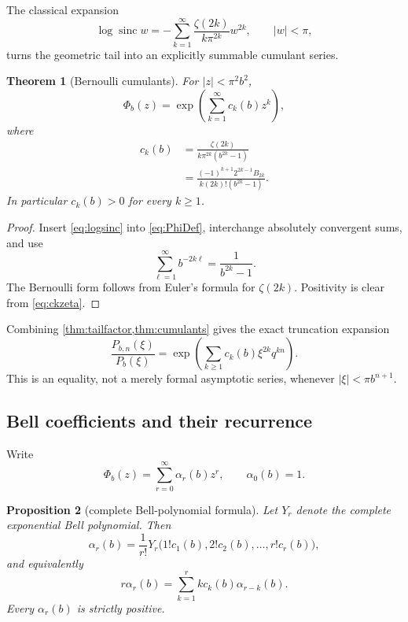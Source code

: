 \documentclass[11pt]{article}
\newtheorem{theorem}{Theorem}[section]
\newtheorem{proposition}[theorem]{Proposition}
\theoremstyle{definition}
\theoremstyle{remark}
\newcommand{\sinc}{\operatorname{sinc}}
\newcommand{\abs}[1]{\left\lvert #1\right\rvert}
\begin{document}
The classical expansion
\begin{equation}
 \log\sinc w=-\sum_{k=1}^{\infty}
 \frac{\zeta(2k)}{k\pi^{2k}}w^{2k},\qquad \abs w<\pi,
 \label{eq:logsinc}
\end{equation}
turns the geometric tail into an explicitly summable cumulant series.

\begin{theorem}[Bernoulli cumulants]
\label{thm:cumulants}
For \(\abs z<\pi^2b^2\),
\begin{equation}
 \Phi_b(z)=\exp\!\left(\sum_{k=1}^{\infty}c_k(b)z^k\right),
 \label{eq:PhiCumulant}
\end{equation}
where
\begin{align}
 c_k(b)
 &=\frac{\zeta(2k)}{k\pi^{2k}(b^{2k}-1)}
 \label{eq:ckzeta}\\
 &=\frac{(-1)^{k+1}2^{2k-1}B_{2k}}
 {k(2k)!(b^{2k}-1)}.
 \label{eq:ckBernoulli}
\end{align}
In particular \(c_k(b)>0\) for every \(k\geq1\).
\end{theorem}

\begin{proof}
Insert \eqref{eq:logsinc} into \eqref{eq:PhiDef}, interchange absolutely
convergent sums, and use
\[
 \sum_{\ell=1}^{\infty}b^{-2k\ell}=\frac1{b^{2k}-1}.
\]
The Bernoulli form follows from Euler's formula for \(\zeta(2k)\). Positivity is
clear from \eqref{eq:ckzeta}.
\end{proof}

Combining \cref{thm:tailfactor,thm:cumulants} gives the exact truncation expansion
\begin{equation}
 \frac{P_{b,n}(\xi)}{P_b(\xi)}
 =\exp\!\left(\sum_{k\geq1}c_k(b)\xi^{2k}q^{kn}\right).
 \label{eq:tailn}
\end{equation}
This is an equality, not a merely formal asymptotic series, whenever
\(\abs\xi<\pi b^{n+1}\).

\subsection{Bell coefficients and their recurrence}

Write
\begin{equation}
 \Phi_b(z)=\sum_{r=0}^{\infty}\alpha_r(b)z^r,
 \qquad \alpha_0(b)=1.
 \label{eq:alphadef}
\end{equation}

\begin{proposition}[complete Bell-polynomial formula]
\label{prop:Bell}
Let \(Y_r\) denote the complete exponential Bell polynomial. Then
\begin{equation}
 \alpha_r(b)=\frac1{r!}
 Y_r\bigl(1!c_1(b),2!c_2(b),\ldots,r!c_r(b)\bigr),
 \label{eq:Bellalpha}
\end{equation}
and equivalently
\begin{equation}
 r\alpha_r(b)=\sum_{k=1}^r k c_k(b)\alpha_{r-k}(b).
 \label{eq:alpharec}
\end{equation}
Every \(\alpha_r(b)\) is strictly positive.
\end{proposition}
\end{document}
